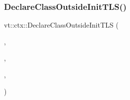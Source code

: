 \subsubsection{\texorpdfstring{Declare\+Class\+Outside\+Init\+T\+L\+S()}{DeclareClassOutsideInitTLS()}}
{\footnotesize\ttfamily vt\+::ctx\+::\+Declare\+Class\+Outside\+Init\+T\+LS (\begin{DoxyParamCaption}\item[{\hyperlink{structvt_1_1ctx_1_1_context}{Context}}]{,  }\item[{\hyperlink{namespacevt_a656e362091da17b9b93d0655b36e3392}{Worker\+I\+D\+Type}}]{,  }\item[{this\+Worker\+\_\+}]{,  }\item[{no\+\_\+worker\+\_\+id}]{ }\end{DoxyParamCaption})}

